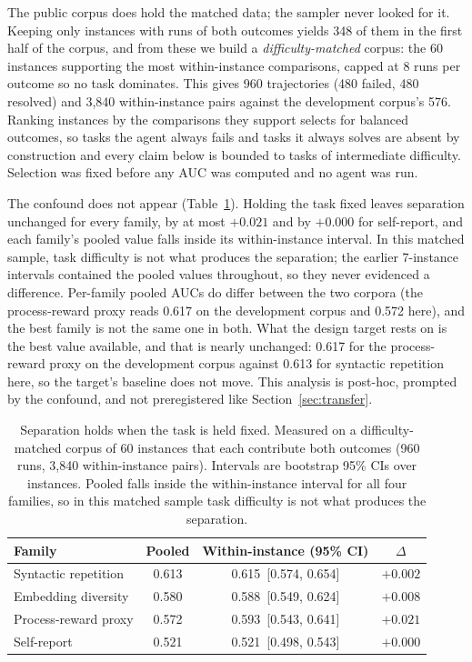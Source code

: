 \documentclass[sigconf,screen]{acmart}
\begin{document}
The public corpus does hold the matched data; the sampler never looked for it. Keeping only
instances with runs of both outcomes yields 348 of them in the first half of the corpus, and from
these we build a \emph{difficulty-matched} corpus: the 60 instances supporting the most
within-instance comparisons, capped at 8 runs per outcome so no task dominates. This gives 960
trajectories (480 failed, 480 resolved) and 3{,}840 within-instance pairs against the development
corpus's 576. Ranking instances by the comparisons they support selects for balanced outcomes, so
tasks the agent always fails and tasks it always solves are absent by construction and every claim
below is bounded to tasks of intermediate difficulty. Selection was fixed before any AUC was
computed and no agent was run.

The confound does not appear (Table~\ref{tab:within}). Holding the task fixed leaves separation
unchanged for every family, by at most $+0.021$ and by $+0.000$ for self-report, and each family's
pooled value falls inside its
within-instance interval. In this matched sample, task difficulty is not what produces the
separation; the earlier 7-instance intervals contained the pooled values throughout, so they never
evidenced a difference. Per-family pooled AUCs do differ between the two corpora (the process-reward
proxy reads 0.617 on the development corpus and 0.572 here), and the best family is not the same one
in both. What the design target rests on is the best value available, and that is nearly unchanged:
0.617 for the process-reward proxy on the development corpus against 0.613 for syntactic repetition
here, so the target's baseline does not move. This analysis is post-hoc, prompted by the confound, and not preregistered
like Section~\ref{sec:transfer}.

\begin{table}[t]
\centering
\small
\caption{Separation holds when the task is held fixed. Measured on a difficulty-matched corpus of 60
instances that each contribute both outcomes (960 runs, 3{,}840 within-instance pairs). Intervals
are bootstrap 95\% CIs over instances. Pooled falls inside the within-instance interval for all
four families, so in this matched sample task difficulty is not what produces the separation.}
\begin{tabular}{lccc}
\toprule
Family & Pooled & Within-instance (95\% CI) & $\Delta$ \\
\midrule
Syntactic repetition & 0.613 & 0.615 \,[0.574, 0.654] & $+0.002$ \\
Embedding diversity  & 0.580 & 0.588 \,[0.549, 0.624] & $+0.008$ \\
Process-reward proxy & 0.572 & 0.593 \,[0.543, 0.641] & $+0.021$ \\
Self-report          & 0.521 & 0.521 \,[0.498, 0.543] & $+0.000$ \\
\bottomrule
\end{tabular}
\label{tab:within}
\end{table}
\end{document}
